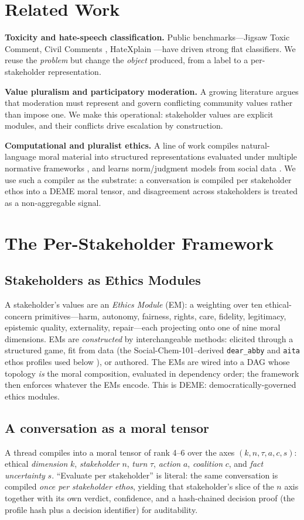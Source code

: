 \documentclass[journal]{IEEEtran}
\begin{document}
\section{Related Work}
\textbf{Toxicity and hate-speech classification.} Public benchmarks---Jigsaw
Toxic Comment, Civil Comments \cite{civil}, HateXplain \cite{hatexplain}---have
driven strong flat classifiers. We reuse the \emph{problem} but change the
\emph{object} produced, from a label to a per-stakeholder representation.

\textbf{Value pluralism and participatory moderation.} A growing literature
argues that moderation must represent and govern conflicting community values
rather than impose one. We make this operational: stakeholder values are
explicit modules, and their conflicts drive escalation by construction.

\textbf{Computational and pluralist ethics.} A line of work compiles
natural-language moral material into structured representations evaluated under
multiple normative frameworks \cite{erisml}, and learns norm/judgment models
from social data \cite{socialchem}. We use such a compiler as the substrate: a
conversation is compiled per stakeholder ethos into a DEME moral tensor, and
disagreement across stakeholders is treated as a non-aggregable signal.

\section{The Per-Stakeholder Framework}
\label{sec:framework}

\subsection{Stakeholders as Ethics Modules}
A stakeholder's values are an \emph{Ethics Module} (EM): a weighting over ten
ethical-concern primitives---harm, autonomy, fairness, rights, care, fidelity,
legitimacy, epistemic quality, externality, repair---each projecting onto one of
nine moral dimensions. EMs are \emph{constructed} by interchangeable methods:
elicited through a structured game, fit from data (the Social-Chem-101--derived
\texttt{dear\_abby} and \texttt{aita} ethos profiles used below
\cite{socialchem}), or authored. The EMs are wired into a DAG whose topology
\emph{is} the moral composition, evaluated in dependency order; the framework
then enforces whatever the EMs encode. This is DEME:
democratically-governed ethics modules.

\subsection{A conversation as a moral tensor}
A thread compiles into a moral tensor of rank 4--6 over the axes
$(k,n,\tau,a,c,s)$: ethical \emph{dimension} $k$, \emph{stakeholder} $n$,
\emph{turn} $\tau$, \emph{action} $a$, \emph{coalition} $c$, and \emph{fact
uncertainty} $s$. ``Evaluate per stakeholder'' is literal: the same conversation
is compiled \emph{once per stakeholder ethos}, yielding that stakeholder's slice
of the $n$ axis together with its own verdict, confidence, and a hash-chained
decision proof (the profile hash plus a decision identifier) for auditability.
\end{document}
